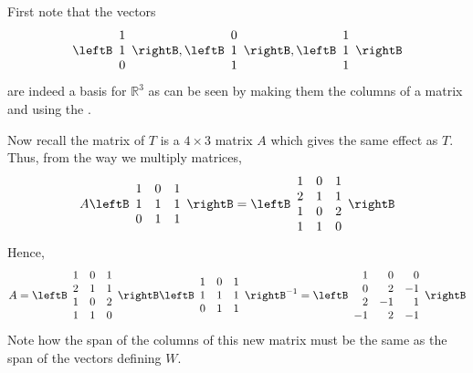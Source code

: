 \begin{solution}
 First note that the vectors 
\begin{equation*}
\leftB
\begin{array}{c}
1 \\ 
1 \\ 
0
\end{array}
\rightB ,\leftB 
\begin{array}{c}
0 \\ 
1 \\ 
1
\end{array}
\rightB ,\leftB 
\begin{array}{c}
1 \\ 
1 \\ 
1
\end{array}
\rightB
\end{equation*}
are indeed a basis for $\mathbb{R}^{3}$ as can be seen by making them the
columns of a matrix and using the {\rref}.

Now recall the matrix of $T$ is a $4\times 3$ matrix $A$ which gives the same
effect as $T.$ Thus, from the way we multiply matrices, 
\begin{equation*}
A\leftB
\begin{array}{rrr}
1 & 0 & 1 \\ 
1 & 1 & 1 \\ 
0 & 1 & 1
\end{array}
\rightB =\leftB 
\begin{array}{rrr}
1 & 0 & 1 \\ 
2 & 1 & 1 \\ 
1 & 0 & 2 \\ 
1 & 1 & 0
\end{array}
\rightB
\end{equation*}
Hence, 
\begin{equation*}
A=\leftB 
\begin{array}{rrr}
1 & 0 & 1 \\ 
2 & 1 & 1 \\ 
1 & 0 & 2 \\ 
1 & 1 & 0
\end{array}
\rightB \leftB 
\begin{array}{rrr}
1 & 0 & 1 \\ 
1 & 1 & 1 \\ 
0 & 1 & 1
\end{array}
\rightB ^{-1}=\leftB 
\begin{array}{rrr}
1 & 0 & 0 \\ 
0 & 2 & -1 \\ 
2 & -1 & 1 \\ 
-1 & 2 & -1
\end{array}
\rightB
\end{equation*}
Note how the span of the columns of this new matrix must be the same as the
span of the vectors defining $W$.
\end{solution}

